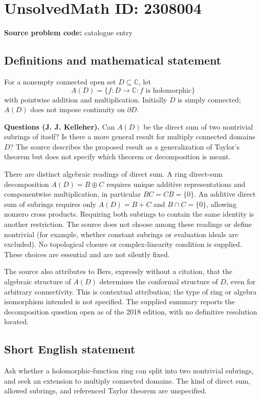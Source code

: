 \documentclass[11pt]{article}
\begin{document}
\section*{UnsolvedMath ID: 2308004}
\textbf{Source problem code:} catalogue entry
\subsection{Definitions and mathematical statement}
For a nonempty connected open set $D\subseteq\mathbb C$, let
\[
A(D)=\{f:D\to\mathbb C:f\text{ is holomorphic}\}
\]
with pointwise addition and multiplication. Initially $D$ is simply connected; $A(D)$ does not impose continuity on $\partial D$.

\textbf{Questions (J. J. Kelleher).} Can $A(D)$ be the direct sum of two nontrivial subrings of itself? Is there a more general result for multiply connected domains $D$? The source describes the proposed result as a generalization of Taylor's theorem but does not specify which theorem or decomposition is meant.

There are distinct algebraic readings of direct sum. A ring direct-sum decomposition $A(D)=B\oplus C$ requires unique additive representations and componentwise multiplication, in particular $BC=CB=\{0\}$. An additive direct sum of subrings requires only $A(D)=B+C$ and $B\cap C=\{0\}$, allowing nonzero cross products. Requiring both subrings to contain the same identity is another restriction. The source does not choose among these readings or define nontrivial (for example, whether constant subrings or evaluation ideals are excluded). No topological closure or complex-linearity condition is supplied. These choices are essential and are not silently fixed.

The source also attributes to Bers, expressly without a citation, that the algebraic structure of $A(D)$ determines the conformal structure of $D$, even for arbitrary connectivity. This is contextual attribution; the type of ring or algebra isomorphism intended is not specified. The supplied summary reports the decomposition question open as of the 2018 edition, with no definitive resolution located.
\subsection{Short English statement}
Ask whether a holomorphic-function ring can split into two nontrivial subrings, and seek an extension to multiply connected domains. The kind of direct sum, allowed subrings, and referenced Taylor theorem are unspecified.
\end{document}
